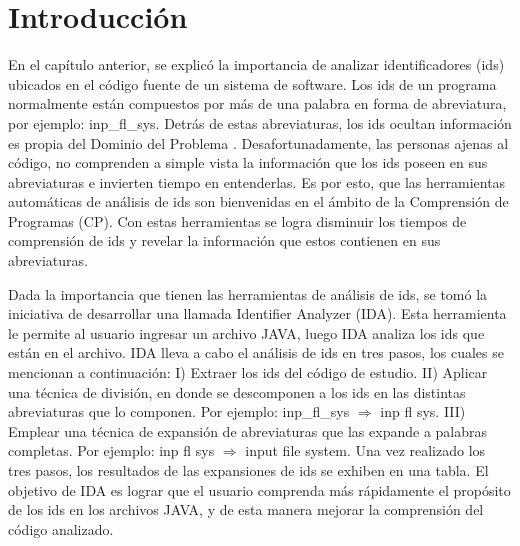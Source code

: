 \fancyhf{}
\pagestyle{fancy}
\lhead[]{\leftmark}
\chead[]{}
\rhead[]{\thepage}
\renewcommand{\headrulewidth}{1pt}

\section{Introducción}

En el capítulo anterior, se explicó la importancia de analizar identificadores (ids) ubicados en el código fuente de un sistema de software. Los ids de un programa normalmente están compuestos por más de una palabra en forma de abreviatura, por ejemplo: \textsf{inp\_fl\_sys}. Detrás de estas abreviaturas, los ids ocultan información es propia del Dominio del Problema \cite{BCPT99,LFBEX07,EZH08,EHPV09}. Desafortunadamente, las personas ajenas al código, no comprenden a simple vista la información que los ids poseen en sus abreviaturas e invierten tiempo en entenderlas. Es por esto, que las herramientas automáticas de análisis de ids son bienvenidas en el ámbito de la Comprensión de Programas (CP). Con estas herramientas se logra disminuir los tiempos de comprensión de ids y revelar la información que estos contienen en sus abreviaturas.

Dada la importancia que tienen las herramientas de análisis de ids, se tomó la iniciativa de desarrollar una llamada Identifier Analyzer (IDA). Esta herramienta le permite al usuario ingresar un archivo JAVA, luego IDA analiza los ids que están en el archivo.
IDA lleva a cabo el análisis de ids en tres pasos, los cuales se mencionan a continuación: I) Extraer los ids del código de estudio. II) Aplicar una técnica de división, en donde se descomponen a los ids en las distintas abreviaturas que lo componen. Por ejemplo: \textsf{inp\_fl\_sys} $\Rightarrow$ \textsf{inp fl sys}. III) Emplear una técnica de expansión de abreviaturas que las expande a palabras completas. Por ejemplo: \textsf{inp fl sys} $\Rightarrow$ \textsf{input file system}. Una vez realizado los tres pasos, los resultados de las expansiones de ids se exhiben en una tabla.
El objetivo de IDA es lograr que el usuario comprenda más rápidamente el propósito de los ids en los archivos JAVA, y de esta manera mejorar la comprensión del código analizado.



